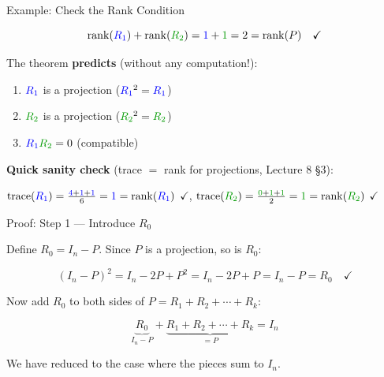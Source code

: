 \documentclass[10pt]{beamer}
\theoremstyle{definition}
\newcommand{\x}[1]{\alert{\textbf{#1}}}
\newcommand{\gn}[1]{{\color{green!60!black}#1}}       %
\newcommand{\bl}[1]{{\color{blue}#1}}                 %
\begin{document}
\begin{frame}{Example: Check the Rank Condition}

$$\operatorname{rank}(\bl{R_1}) + \operatorname{rank}(\gn{R_2}) = \bl{1} + \gn{1} = 2 = \operatorname{rank}(P) \quad \checkmark$$

\vspace{0.5em}

The theorem \x{predicts} (without any computation!):

\begin{enumerate}
\item $\bl{R_1}$ is a projection ($\bl{R_1}^2 = \bl{R_1}$)
\item $\gn{R_2}$ is a projection ($\gn{R_2}^2 = \gn{R_2}$)
\item $\bl{R_1}\gn{R_2} = 0$ (compatible)
\end{enumerate}

\vspace{0.5em}

\x{Quick sanity check} (trace $=$ rank for projections, Lecture 8 \S3):

$\operatorname{trace}(\bl{R_1}) = \frac{\bl{4}+\bl{1}+\bl{1}}{6} = \bl{1} = \operatorname{rank}(\bl{R_1})$ $\checkmark$, \quad $\operatorname{trace}(\gn{R_2}) = \frac{\gn{0}+\gn{1}+\gn{1}}{2} = \gn{1} = \operatorname{rank}(\gn{R_2})$ $\checkmark$

\end{frame}


\begin{frame}{Proof: Step 1 --- Introduce $R_0$}

Define $R_0 = I_n - P$. Since $P$ is a projection, so is $R_0$:

$$(I_n - P)^2 = I_n - 2P + P^2 = I_n - 2P + P = I_n - P = R_0 \quad \checkmark$$

\vspace{0.5em}

Now add $R_0$ to both sides of $P = R_1 + R_2 + \cdots + R_k$:

$$\underbrace{R_0}_{I_n - P} + \underbrace{R_1 + R_2 + \cdots + R_k}_{= P} = I_n$$

\vspace{0.5em}

We have reduced to the case where the pieces sum to $I_n$.

\end{frame}
\end{document}
